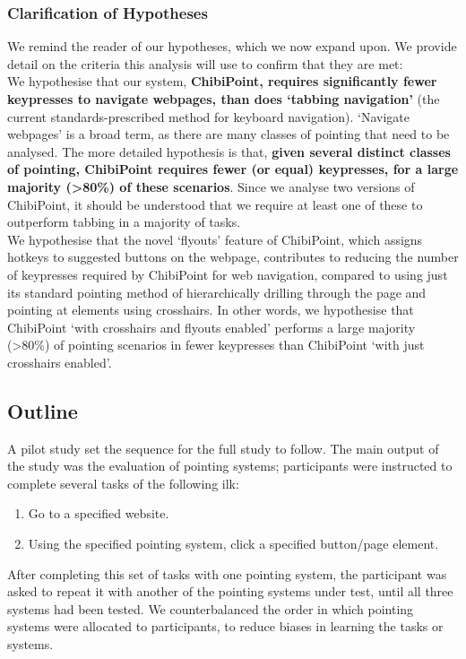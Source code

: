 \documentclass[11pt,openright,a4paper]{report}
\begin{document}
\subsubsection{Clarification of Hypotheses}
\label{sec:detailedhyp}
We remind the reader of our hypotheses, which we now expand upon. We provide detail on the criteria this analysis will use to confirm that they are met:
\textbf{\hypone}\\
We hypothesise that our system, \textbf{ChibiPoint, requires significantly fewer keypresses to navigate webpages, than does `tabbing navigation'} (the current standards-prescribed method for keyboard navigation).
`Navigate webpages' is a broad term, as there are many classes of pointing that need to be analysed. The more detailed hypothesis is that, \textbf{given several distinct classes of pointing, ChibiPoint requires fewer (or equal) keypresses, for a large majority (>80\%) of these scenarios}. Since we analyse two versions of ChibiPoint, it should be understood that we require at least one of these to outperform tabbing in a majority of tasks.
\textbf{\hyptwo}\\
We hypothesise that the novel `flyouts' feature of ChibiPoint, which assigns hotkeys to suggested buttons on the webpage, contributes to reducing the number of keypresses required by ChibiPoint for web navigation, compared to using just its standard pointing method of hierarchically drilling through the page and pointing at elements using crosshairs.
In other words, we hypothesise that ChibiPoint `with crosshairs and flyouts enabled' performs a large majority (>80\%) of pointing scenarios in fewer keypresses than ChibiPoint `with just crosshairs enabled'.
\subsection{Outline}
A pilot study set the sequence for the full study to follow. The main output of the study was the evaluation of pointing systems; participants were instructed to complete several tasks of the following ilk:
\begin{enumerate}
\item Go to a specified website.
\item Using the specified pointing system, click a specified button/page element.
\end{enumerate}
After completing this set of tasks with one pointing system, the participant was asked to repeat it with another of the pointing systems under test, until all three systems had been tested. We counterbalanced the order in which pointing systems were allocated to participants, to reduce biases in learning the tasks or systems.
\end{document}
